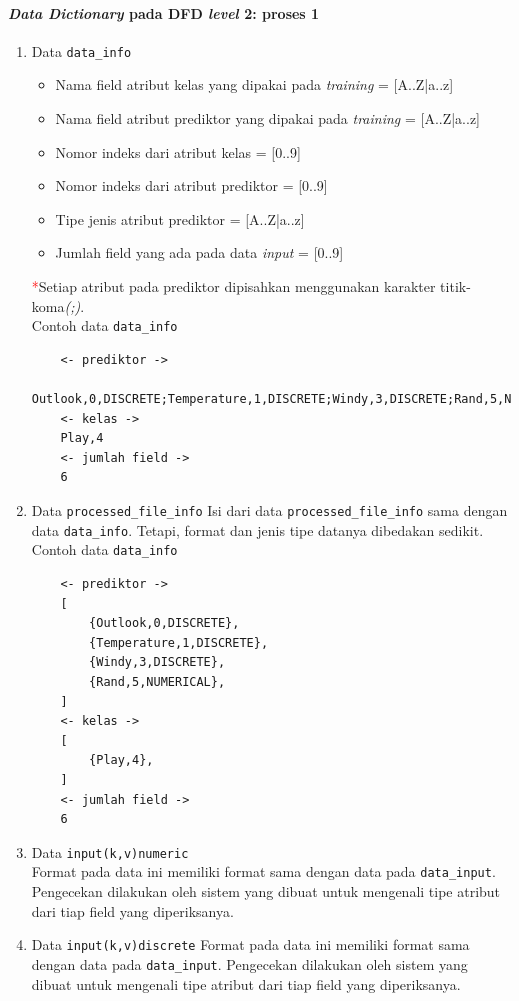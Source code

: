 \paragraph{\textit{Data Dictionary} pada DFD \textit{level} 2: proses 1}
\begin{enumerate}
	\item{Data \verb|data_info|}
		\begin{itemize}
			\item Nama field atribut kelas yang dipakai pada \textit{training} = [A..Z|a..z]
			\item Nama field atribut prediktor yang dipakai pada \textit{training} = [A..Z|a..z]
			\item Nomor indeks dari atribut kelas = [0..9]
			\item Nomor indeks dari atribut prediktor = [0..9]
			\item Tipe jenis atribut prediktor = [A..Z|a..z]
			\item Jumlah field yang ada pada data \textit{input} = [0..9]
		\end{itemize}
		 \textcolor{red}{*}Setiap atribut pada prediktor dipisahkan menggunakan karakter titik-koma\textit{(;)}.\\
	Contoh data \verb|data_info|
	\begin{lstlisting}
	<- prediktor ->
	Outlook,0,DISCRETE;Temperature,1,DISCRETE;Windy,3,DISCRETE;Rand,5,NUMERICAL
	<- kelas ->
	Play,4
	<- jumlah field ->
	6
	\end{lstlisting}
	
	\item{Data \verb|processed_file_info|}
	Isi dari data \verb|processed_file_info| sama dengan data \verb|data_info|. Tetapi, format dan jenis tipe datanya dibedakan sedikit.
	Contoh data \verb|data_info|
	\begin{lstlisting}
	<- prediktor ->
	[
		{Outlook,0,DISCRETE},
		{Temperature,1,DISCRETE},
		{Windy,3,DISCRETE},
		{Rand,5,NUMERICAL},
	]
	<- kelas ->
	[
		{Play,4},
	]
	<- jumlah field ->
	6
	\end{lstlisting}	
	
	\item{Data \verb|input(k,v)numeric|}\\
	Format pada data ini memiliki format sama dengan data pada \verb|data_input|. Pengecekan dilakukan oleh sistem yang dibuat untuk mengenali tipe atribut dari tiap field yang diperiksanya.	
	
	\item{Data \verb|input(k,v)discrete|}
	Format pada data ini memiliki format sama dengan data pada \verb|data_input|. Pengecekan dilakukan oleh sistem yang dibuat untuk mengenali tipe atribut dari tiap field yang diperiksanya.


\end{enumerate}
